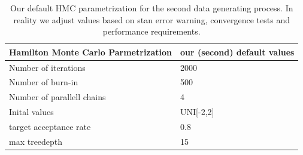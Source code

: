 \begin{table}[!ht]
\begin{center}
\begin{tabular}{l l}
Hamilton Monte Carlo Parmetrization & our (second) default values\\
\hline
Number of iterations &2000  \\
Number of burn-in & 500 \\
Number of parallell chains & 4  \\
Inital values & UNI[-2,2]  \\
target acceptance rate & 0.8  \\
max treedepth & 15 \\
\end{tabular}
\end{center}
\caption{Our default HMC parametrization for the second data generating process. In reality we adjust values based on stan error warning, convergence tests and performance requirements.}
\label{tab:default_2}
\end{table}


